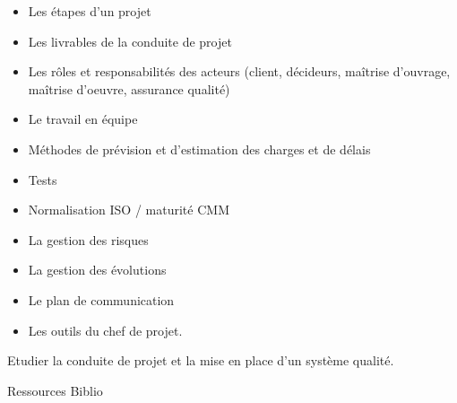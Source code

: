\vfill

{
\begin{itemize}
\item Les étapes d'un projet
\item Les livrables de la conduite de projet
\item Les rôles et responsabilités des acteurs (client, décideurs, maîtrise d'ouvrage, maîtrise d'oeuvre, assurance qualité)
\item Le travail en équipe
\item Méthodes de prévision et d'estimation des charges et de délais
\item Tests
\item Normalisation ISO / maturité CMM
\item La gestion des risques
\item La gestion des évolutions
\item Le plan de communication
\item Les outils du chef de projet.
\end{itemize}
} 
{} 
{\begin{itemize} 
  \ObjItem Etudier la conduite de projet et la mise en place d'un système qualité.
\end{itemize} 
} 
{Ressources} 
{Biblio} 
 
\vfill

